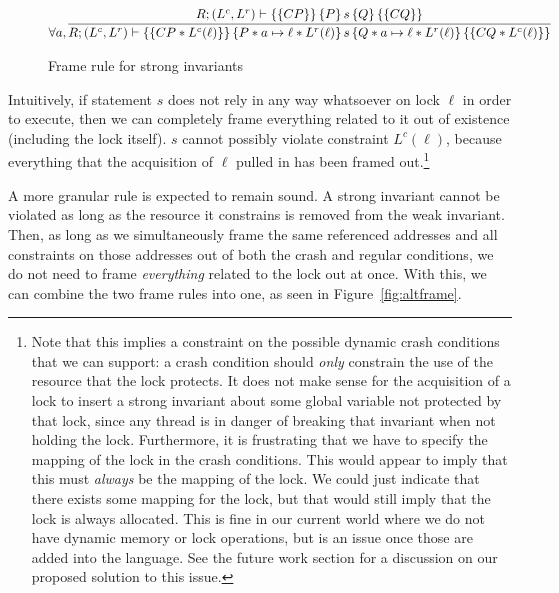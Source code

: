 \begin{figure*}
\begin{gather*}
    \forall a, \infer
	{\hoarestmt{R}{(L^c,L^r)}{CP * L^c(\ell)}{P * a \mapsto \ell * L^r(\ell)}{s}{Q * a \mapsto \ell * L^r(\ell)}{CQ * L^c(\ell)}}
	{\hoarestmt{R}{(L^c,L^r)}{CP}{P}{s}{Q}{CQ}}
\end{gather*}
\caption{Frame rule for strong invariants}
\label{fig:stronginv}
\end{figure*}

Intuitively, if statement $s$ does not rely in any way whatsoever on lock $\ell$
in order to execute, then we can completely frame everything related to it out
of existence (including the lock itself). $s$ cannot possibly violate constraint
$L^c(\ell)$, because everything that the acquisition of $\ell$ pulled in has
been framed out.\footnote{Note that this implies a constraint on the possible
dynamic crash conditions that we can support: a crash condition should
\textit{only} constrain the use of the resource that the lock protects. It does
not make sense for the acquisition of a lock to insert a strong invariant about
some global variable not protected by that lock, since any thread is in danger
of breaking that invariant when not holding the lock. Furthermore, it is
frustrating that we have to specify the mapping of the lock in the crash
conditions. This would appear to imply that this must \textit{always} be the
mapping of the lock. We could just indicate that there exists some mapping
for the lock, but that would still imply that the lock is always allocated.
This is fine in our current world where we do not have dynamic memory or lock
operations, but is an issue once those are added into the language. See the
future work section for a discussion on our proposed solution to this issue.}

A more granular rule is expected to remain sound. A strong invariant cannot be
violated as long as the resource it constrains is removed from the weak
invariant. Then, as long as we simultaneously frame the same referenced
addresses and all constraints on those addresses out of both the crash and
regular conditions, we do not need to frame \textit{everything} related to the
lock out at once. With this, we can combine the two frame rules into one, as
seen in Figure~\ref{fig:altframe}.


